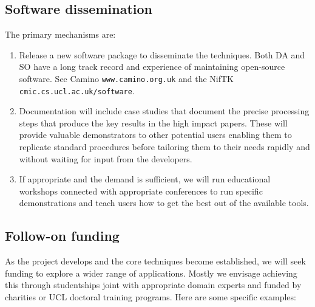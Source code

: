 \documentclass[a4paper,11pt]{article}
\begin{document}
\subsection*{Software dissemination}

The primary mechanisms are:

\begin{enumerate}

\item Release a new software package to disseminate the techniques.
  Both DA and SO have a long track record and experience of
  maintaining open-source software.  See Camino
  \verb+www.camino.org.uk+ and the NifTK
  \verb+cmic.cs.ucl.ac.uk/software+.

\item Documentation will include case studies that document the
precise processing steps that produce the key results in the high
impact papers.  These will provide valuable demonstrators to other
potential users enabling them to replicate standard procedures before
tailoring them to their needs rapidly and without waiting for input
from the developers.

\item If appropriate and the demand is sufficient, we will run
educational workshops connected with appropriate conferences to run
specific demonstrations and teach users how to get the best out of the
available tools.

\end{enumerate}

\subsection*{Follow-on funding}

As the project develops and the core techniques become established, we
will seek funding to explore a wider range of applications.  Mostly we
envisage achieving this through studentships joint with appropriate
domain experts and funded by charities or UCL doctoral training
programs.  Here are some specific examples:
\end{document}
